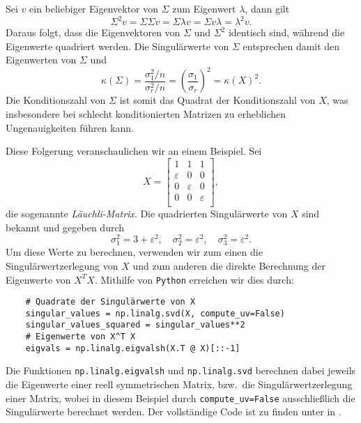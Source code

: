 Sei \(v\) ein beliebiger Eigenvektor von \(\Sigma\) zum Eigenwert \(\lambda\), dann gilt
\begin{equation*}
    \Sigma^{2}v = \Sigma \Sigma v = \Sigma \lambda v = \Sigma v \lambda = \lambda^{2} v.
\end{equation*}   
Daraus folgt, dass die Eigenvektoren von \(\Sigma\) und \(\Sigma^{2}\) identisch sind, während die Eigenwerte quadriert werden.
Die Singulärwerte von \(\Sigma\) entsprechen damit den Eigenwerten von \(\Sigma\) und
\begin{equation*}
    \kappa(\Sigma) = \frac{\sigma_{1}^{2}/n}{\sigma_{r}^{2}/n}={\left(\frac{\sigma_{1}}{\sigma_{r}}\right)}^{2} = {\kappa(X)}^{2}.
\end{equation*}  
Die Konditionszahl von \(\Sigma\) ist somit das Quadrat der Konditionszahl von \(X\), was insbesondere bei schlecht konditionierten Matrizen zu erheblichen Ungenauigkeiten führen kann.

Diese Folgerung veranschaulichen wir an einem Beispiel.
Sei 
\begin{equation*}
    X = 
    \begin{bmatrix}
        1 & 1 & 1 \\
        \varepsilon & 0 & 0 \\
        0 & \varepsilon & 0 \\
        0 & 0 & \varepsilon \\
    \end{bmatrix},
\end{equation*}
die sogenannte \emph{Läuchli-Matrix}.
Die quadrierten Singulärwerte von \(X\) sind bekannt und gegeben durch  
\begin{equation*}
    \sigma_{1}^{2} = 3 + \varepsilon^{2}, \quad \sigma_{2}^{2} = \varepsilon^{2}, \quad \sigma_{3}^{2} = \varepsilon^{2}.
\end{equation*} 
Um diese Werte zu berechnen, verwenden wir zum einen die Singulärwertzerlegung von \(X\) und zum anderen die direkte Berechnung der Eigenwerte von \(X^{T}X\).   
Mithilfe von \texttt{Python} erreichen wir dies durch:
\begin{verbatim}
    # Quadrate der Singulärwerte von X
    singular_values = np.linalg.svd(X, compute_uv=False)
    singular_values_squared = singular_values**2   
    # Eigenwerte von X^T X
    eigvals = np.linalg.eigvalsh(X.T @ X)[::-1]
\end{verbatim}
Die Funktionen \texttt{np.linalg.eigvalsh} und \texttt{np.linalg.svd} berechnen dabei jeweils die Eigenwerte einer reell symmetrischen Matrix, bzw.\ die Singulärwertzerlegung einer Matrix, wobei in diesem Beispiel durch \texttt{compute_uv=False} ausschließlich die Singulärwerte berechnet werden. 
Der vollständige Code ist zu finden unter  in .

